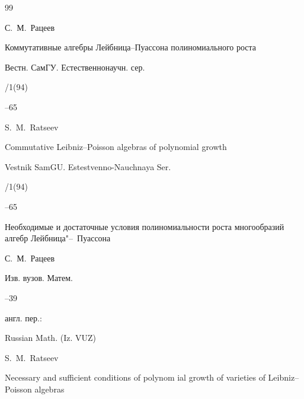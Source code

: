 \begin{thebibliography}{99}






\by С.~М.~Рацеев

\paper Коммутативные алгебры Лейбница--Пуассона полиномиального роста

\jour Вестн. СамГУ. Естественнонаучн. сер.


/1(94)

--65



\misctransl

\by S.~M.~Ratseev

\paper Commutative Leibniz--Poisson algebras of polynomial growth

\jour Vestnik SamGU. Estestvenno-Nauchnaya Ser.


/1(94)

--65






\paper Необходимые и достаточные условия полиномиальности роста многообразий алгебр Лейбница"--~Пуассона

\by С.~М.~Рацеев

\jour Изв. вузов. Матем.



–39

\transl англ. пер.:~

\jour Russian Math. (Iz. VUZ)




\by S.~M.~Ratseev

\paper Necessary and sufficient conditions of polynom ial growth of varieties of Leibniz--Poisson algebras

\toappear





\end{thebibliography}







